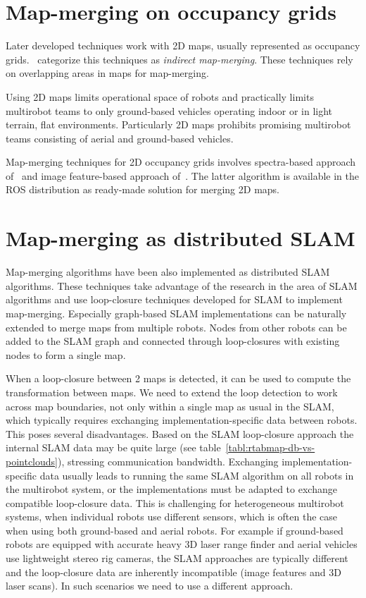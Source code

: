 \section{Map-merging on occupancy grids}

Later developed techniques work with \gls{2D} maps, usually represented as occupancy grids. \citet{lee2012survey}~categorize this techniques as \textit{indirect map-merging}. These techniques rely on overlapping areas in maps for map-merging.

Using \gls{2D} maps limits operational space of robots and practically limits multirobot teams to only ground-based vehicles operating indoor or in light terrain, flat environments. Particularly \gls{2D} maps prohibits promising multirobot teams consisting of aerial and ground-based vehicles.

Map-merging techniques for \gls{2D} occupancy grids involves spectra-based approach of~\citet{carpin2008spectra} and image feature-based approach of~\citet{Horner2016}. The latter algorithm is available in the \gls{ROS} distribution as ready-made solution for merging \gls{2D} maps.

\section{Map-merging as distributed SLAM}

Map-merging algorithms have been also implemented as distributed \gls{SLAM} algorithms. These techniques take advantage of the research in the area of \gls{SLAM} algorithms and use loop-closure techniques developed for \gls{SLAM} to implement map-merging. Especially graph-based \gls{SLAM} implementations can be naturally extended to merge maps from multiple robots. Nodes from other robots can be added to the \gls{SLAM} graph and connected through loop-closures with existing nodes to form a single map.

When a loop-closure between 2 maps is detected, it can be used to compute the transformation between maps. We need to extend the loop detection to work across map boundaries, not only within a single map as usual in the \gls{SLAM}, which typically requires exchanging implementation-specific data between robots. This poses several disadvantages. Based on the \gls{SLAM} loop-closure approach the internal \gls{SLAM} data may be quite large (see table~\ref{tabl:rtabmap-db-vs-pointclouds}), stressing communication bandwidth. Exchanging implementation-specific data usually leads to running the same \gls{SLAM} algorithm on all robots in the multirobot system, or the implementations must be adapted to exchange compatible loop-closure data. This is challenging for heterogeneous multirobot systems, when individual robots use different sensors, which is often the case when using both ground-based and aerial robots. For example if ground-based robots are equipped with accurate heavy \gls{3D} laser range finder and aerial vehicles use lightweight stereo rig cameras, the \gls{SLAM} approaches are typically different and the loop-closure data are inherently incompatible (image features and \gls{3D} laser scans). In such scenarios we need to use a different approach.

